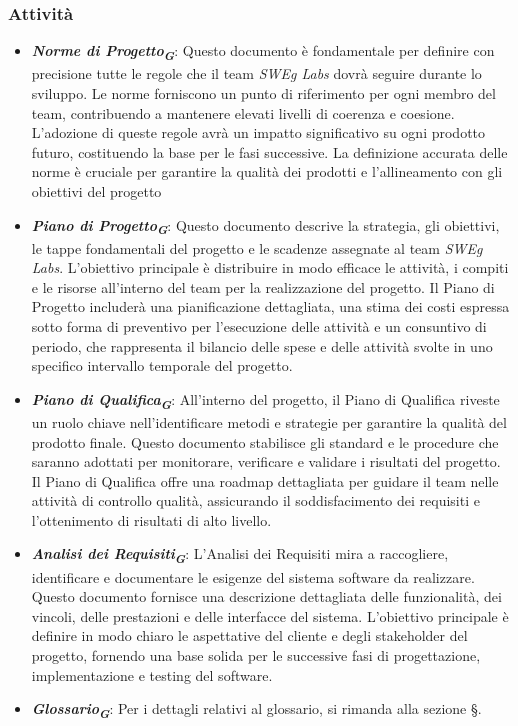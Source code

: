 \subsubsection{Attività}

\begin{itemize}
\item \textbf{\emph{Norme di Progetto}}\textsubscript{\textit{\textbf{G}}}: Questo documento è fondamentale per definire con precisione tutte le regole che il team \emph{SWEg Labs} dovrà seguire durante lo sviluppo. Le norme forniscono un punto di riferimento per ogni membro del team, contribuendo a mantenere elevati livelli di coerenza e coesione. L'adozione di queste regole avrà un impatto significativo su ogni prodotto futuro, costituendo la base per le fasi successive. La definizione accurata delle norme è cruciale per garantire la qualità dei prodotti e l’allineamento con gli obiettivi del progetto
\item \textbf{\emph{Piano di Progetto}}\textsubscript{\textit{\textbf{G}}}: Questo documento descrive la strategia, gli obiettivi, le tappe fondamentali del progetto e le scadenze assegnate al team \emph{SWEg Labs}. L'obiettivo principale è distribuire in modo efficace le attività, i compiti e le risorse all'interno del team per la realizzazione del progetto. Il Piano di Progetto includerà una pianificazione dettagliata, una stima dei costi espressa sotto forma di preventivo per l’esecuzione delle attività e un consuntivo di periodo, che rappresenta il bilancio delle spese e delle attività svolte in uno specifico intervallo temporale del progetto.
\item \textbf{\emph{Piano di Qualifica}}\textsubscript{\textit{\textbf{G}}}: All'interno del progetto, il Piano di Qualifica riveste un ruolo chiave nell'identificare metodi e strategie per garantire la qualità del prodotto finale. Questo documento stabilisce gli standard e le procedure che saranno adottati per monitorare, verificare e validare i risultati del progetto. Il Piano di Qualifica offre una roadmap dettagliata per guidare il team nelle attività di controllo qualità, assicurando il soddisfacimento dei requisiti e l'ottenimento di risultati di alto livello.
\item \textbf{\emph{Analisi dei Requisiti}}\textsubscript{\textit{\textbf{G}}}: L'Analisi dei Requisiti mira a raccogliere, identificare e documentare le esigenze del sistema software da realizzare. Questo documento fornisce una descrizione dettagliata delle funzionalità, dei vincoli, delle prestazioni e delle interfacce del sistema. L'obiettivo principale è definire in modo chiaro le aspettative del cliente e degli stakeholder del progetto, fornendo una base solida per le successive fasi di progettazione, implementazione e testing del software.
\item \textbf{\emph{Glossario}}\textsubscript{\textit{\textbf{G}}}: Per i dettagli relativi al glossario, si rimanda alla sezione \S{}.
\end{itemize}

